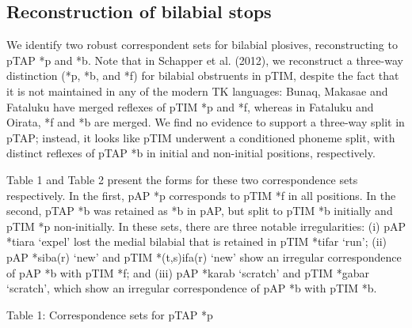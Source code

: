 \subsection[Reconstruction of bilabial stops]{\textbf{Reconstruction of bilabial stops}}
\hypertarget{RefHeading65407871885726}{}We identify two robust correspondent sets for bilabial plosives, reconstructing to pTAP *p and *b. Note that in Schapper et al. (2012), we reconstruct a three-way distinction (*p, *b, and *f) for bilabial obstruents in pTIM, despite the fact that it is not maintained in any of the modern TK languages: Bunaq, Makasae and Fataluku have merged reflexes of pTIM *p and *f, whereas in Fataluku and Oirata, *f and *b are merged. We find no evidence to support a three-way split in pTAP; instead, it looks like pTIM underwent a conditioned phoneme split, with distinct reflexes of pTAP *b in initial and non-initial positions, respectively. 

Table 1 and Table 2 present the forms for these two correspondence sets respectively. In the first, pAP *p corresponds to pTIM *f in all positions. In the second, pTAP *b was retained as *b in pAP, but split to pTIM *b initially and pTIM *p non-initially. In these sets, there are three notable irregularities: (i) pAP *tiara {\textquoteleft}expel{\textquoteright} lost the medial bilabial that is retained in pTIM *tifar {\textquoteleft}run{\textquoteright}; (ii) pAP *siba(r) {\textquoteleft}new{\textquoteright} and pTIM *(t,s)ifa(r) {\textquoteleft}new{\textquoteright} show an irregular correspondence of pAP *b with pTIM *f; and (iii) pAP *karab {\textquoteleft}scratch{\textquoteright} and pTIM *gabar {\textquoteleft}scratch{\textquoteright}, which show an irregular correspondence of pAP *b with pTIM *b. 

{\centering
Table 1: Correspondence sets for pTAP *p
\par}

